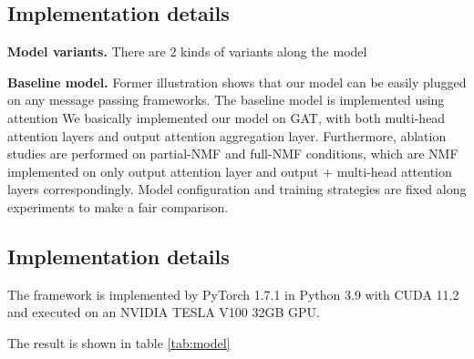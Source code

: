 \documentclass[english,onecolumn]{IEEEtran}
\begin{document}
	\subsection{Implementation details}
	\textbf{Model variants.}	There are 2 kinds of variants along the model
	
	\textbf{Baseline model.} Former illustration shows that our model can be easily plugged on any message passing frameworks. The baseline model is implemented using attention
	We basically implemented our model on GAT, with both multi-head attention layers and output attention aggregation layer. Furthermore, ablation studies are performed on partial-NMF and full-NMF conditions, which are NMF implemented on only output attention layer and output + multi-head attention layers correspondingly. Model configuration and training strategies are fixed along experiments to make a fair comparison. 
	
	
	\subsection{Implementation details}
	The framework is implemented by PyTorch 1.7.1 in Python 3.9 with CUDA 11.2 and executed on an NVIDIA \textregistered TESLA \textregistered V100 32GB GPU. 
	
	The result is shown in table \ref{tab:model}
	
\end{document}
